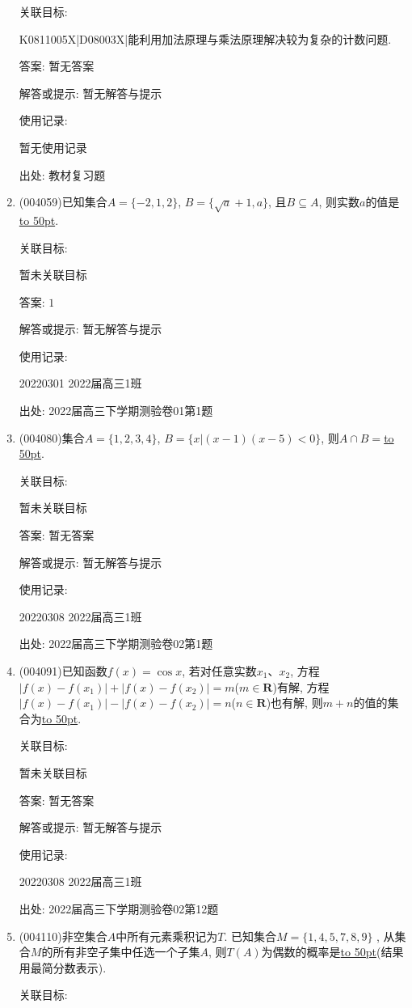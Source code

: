 \documentclass[10pt,a4paper]{article}
\newcommand{\blank}[1]{\underline{\hbox to #1pt{}}}
\begin{document}
\begin{enumerate}[1.]
关联目标:

K0811005X|D08003X|能利用加法原理与乘法原理解决较为复杂的计数问题.

答案: 暂无答案

解答或提示: 暂无解答与提示

使用记录:

暂无使用记录


出处: 教材复习题
\item { (004059)}已知集合$A=\{-2,1,2\}$, $B=\{\sqrt a+1,a\}$, 且$B\subseteq A$, 则实数$a$的值是\blank{50}.


关联目标:

暂未关联目标

答案: $1$

解答或提示: 暂无解答与提示

使用记录:

20220301	2022届高三1班	


出处: 2022届高三下学期测验卷01第1题
\item { (004080)}集合$A=\{1,2,3,4\}$, $B=\{x|(x-1)(x-5)<0\}$, 则$A\cap B=$\blank{50}.


关联目标:

暂未关联目标

答案: 暂无答案

解答或提示: 暂无解答与提示

使用记录:

20220308	2022届高三1班	


出处: 2022届高三下学期测验卷02第1题
\item { (004091)}已知函数$f(x)=\cos x$, 若对任意实数$x_1$、$x_2$, 方程$|f(x)-f(x_1)|+|f(x)-f(x_2)|=m$($m\in \mathbf{R}$)有解, 方程$|f(x)-f(x_1)|-|f(x)-f(x_2)|=n$($n\in \mathbf{R}$)也有解, 则$m+n$的值的集合为\blank{50}.


关联目标:

暂未关联目标

答案: 暂无答案

解答或提示: 暂无解答与提示

使用记录:

20220308	2022届高三1班	


出处: 2022届高三下学期测验卷02第12题
\item { (004110)}非空集合$A$中所有元素乘积记为$T$. 已知集合$M=\{1,4,5,7,8,9\}$ , 从集合$M$的所有非空子集中任选一个子集$A$, 则$T(A)$为偶数的概率是\blank{50}(结果用最简分数表示).


关联目标:


\end{enumerate}
\end{document}

